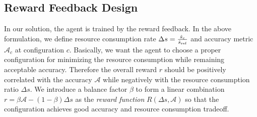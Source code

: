 \subsection{Reward Feedback Design}
\label{subsec: reward}

In our solution, the agent is trained by the reward feedback. In the above formulation, we define resource consumption rate $ \Delta s = \frac{\hat{s}_c}{\hat{s}_{\rm ref}} $ and accuracy metric $ \mathcal{A}_c $ at configuration $ c $. Basically, we want the agent to choose a proper configuration for minimizing the resource consumption while remaining acceptable accuracy. Therefore the overall reward $ r $ should be positively correlated with the accuracy $ \mathcal{A} $ while negatively with the resource consumption ratio $ \Delta s $. We introduce a balance factor $ \beta $ to form a linear combination $ r = \beta \mathcal{A} - (1-\beta) \Delta s  $ as the \emph{reward function} $ R(\Delta s, \mathcal{A}) $ so that the configuration achieves good accuracy and resource consumption tradeoff. %
